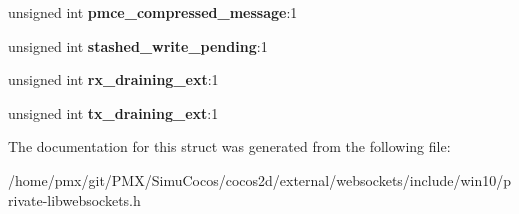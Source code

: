 \begin{DoxyCompactItemize}
\mbox{\label{struct__lws__websocket__related_a16e29cb5f14f4ebb44cfce3e7453b1c5}} 
unsigned int {\bfseries pmce\+\_\+compressed\+\_\+message}\+:1
\item 
\mbox{\label{struct__lws__websocket__related_a621d2ce308a05d9cee57ddb718cefa19}} 
unsigned int {\bfseries stashed\+\_\+write\+\_\+pending}\+:1
\item 
\mbox{\label{struct__lws__websocket__related_a2e77202976efd66917371d96e372808d}} 
unsigned int {\bfseries rx\+\_\+draining\+\_\+ext}\+:1
\item 
\mbox{\label{struct__lws__websocket__related_abdf63e73f041d1d2c86f3eb3fd18ad80}} 
unsigned int {\bfseries tx\+\_\+draining\+\_\+ext}\+:1
\end{DoxyCompactItemize}


The documentation for this struct was generated from the following file\+:\begin{DoxyCompactItemize}
\item 
/home/pmx/git/\+P\+M\+X/\+Simu\+Cocos/cocos2d/external/websockets/include/win10/private-\/libwebsockets.\+h\end{DoxyCompactItemize}
